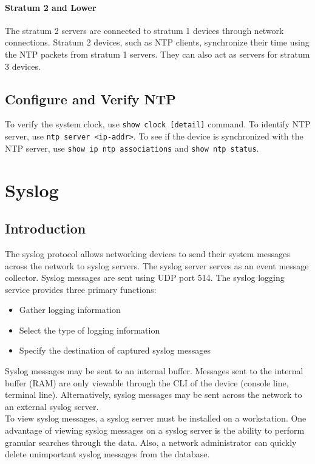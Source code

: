 \paragraph{Stratum 2 and Lower}The stratum 2 servers are connected to stratum 1 devices through network connections. Stratum 2 devices, such as NTP clients, synchronize their time using the NTP packets from stratum 1 servers. They can also act as servers for stratum 3 devices.

\subsection{Configure and Verify NTP}

To verify the system clock, use \verb|show clock [detail]| command. To identify NTP server, use \verb|ntp server <ip-addr>|. To see if the device is synchronized with the NTP server, use \verb|show ip ntp associations| and \verb|show ntp status|.

\section{Syslog}

\subsection{Introduction}

The syslog protocol allows networking devices to send their system messages across the network to syslog servers. The syslog server serves as an event message collector. Syslog messages are sent using UDP port 514. The syslog logging service provides three primary functions:

\begin{itemize}
\item Gather logging information
\item Select the type of logging information
\item Specify the destination of captured syslog messages
\end{itemize}

Syslog messages may be sent to an internal buffer. Messages sent to the internal buffer (RAM) are only viewable through the CLI of the device (console line, terminal line). Alternatively, syslog messages may be sent across the network to an external syslog server.\\

To view syslog messages, a syslog server must be installed on a workstation. One advantage of viewing syslog messages on a syslog server is the ability to perform granular searches through the data. Also, a network administrator can quickly delete unimportant syslog messages from the database.

